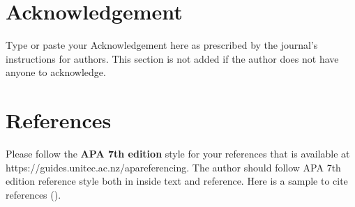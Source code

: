 \documentclass[12pt,a4paper]{article}
\begin{document}
\section*{Acknowledgement}
Type or paste your Acknowledgement here as prescribed by the journal’s instructions for authors. This section is not added if the author does not have anyone to acknowledge.

\section*{References}
Please follow the \textbf{APA 7th edition} style for your references that is available at https://guides.unitec.ac.nz/apareferencing. The author should follow APA 7th edition reference style both in inside text and reference. Here is a sample to cite references (\cite{atanu2022}).

\printbibliography
\end{document}
